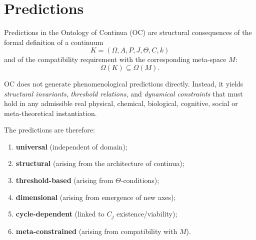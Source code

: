 

\section{Predictions}
\label{sec:predictions-master}

Predictions in the Ontology of Continua (OC) are structural consequences  
of the formal definition of a continuum
\[
K = (\Omega, A, P, J, \Theta, C, k)
\]
and of the compatibility requirement with the corresponding meta-space $M$:
\[
\Omega(K) \subseteq \Omega(M).
\]

OC does not generate phenomenological predictions directly.  
Instead, it yields \emph{structural invariants},  
\emph{threshold relations}, and \emph{dynamical constraints}  
that must hold in any admissible real physical, chemical, biological,  
cognitive, social or meta-theoretical instantiation.

The predictions are therefore:

\begin{enumerate}
    \item \textbf{universal} (independent of domain);
    \item \textbf{structural} (arising from the architecture of continua);
    \item \textbf{threshold-based} (arising from $\Theta$-conditions);
    \item \textbf{dimensional} (arising from emergence of new axes);
    \item \textbf{cycle-dependent} (linked to $C_j$ existence/viability);
    \item \textbf{meta-constrained} (arising from compatibility with $M$).
\end{enumerate}

